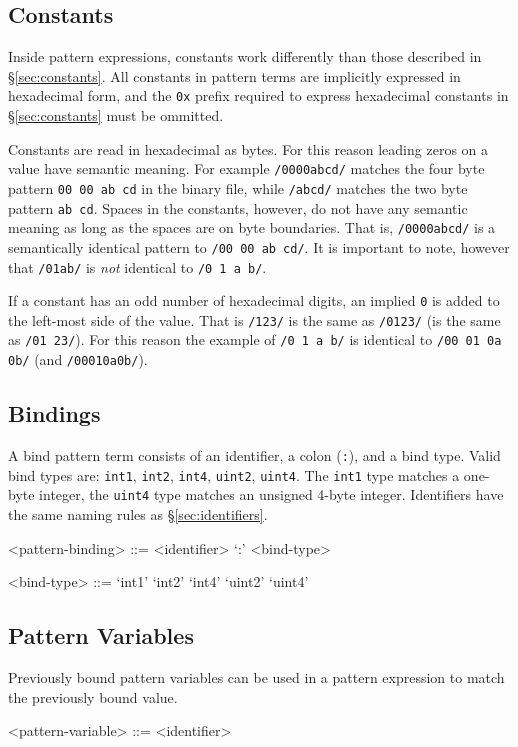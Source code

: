 \subsection{Constants}
\label{sec:pattern-constants}
Inside pattern expressions, constants work differently than those described in \S\ref{sec:constants}.  All constants in pattern terms are implicitly expressed in hexadecimal form, and the \texttt{0x} prefix required to express hexadecimal constants in \S\ref{sec:constants} must be ommitted.

Constants are read in hexadecimal as bytes.  For this reason leading zeros on a value have semantic meaning.  For example \texttt{/0000abcd/} matches the four byte pattern \texttt{00 00 ab cd} in the binary file, while \texttt{/abcd/} matches the two byte pattern \texttt{ab cd}.  Spaces in the constants, however, do not have any semantic meaning as long as the spaces are on byte boundaries.  That is, \texttt{/0000abcd/} is a semantically identical pattern to \texttt{/00 00 ab cd/}.  It is important to note, however that \texttt{/01ab/} is \emph{not} identical to \texttt{/0 1 a b/}.

If a constant has an odd number of hexadecimal digits, an implied \texttt{0} is added to the left-most side of the value.  That is \texttt{/123/} is the same as \texttt{/0123/} (is the same as \texttt{/01 23/}).  For this reason the example of \texttt{/0 1 a b/} is identical to \texttt{/00 01 0a 0b/} (and \texttt{/00010a0b/}).
 
\subsection{Bindings}
\label{sec:pattern-bindings}
A bind pattern term consists of an identifier, a colon (\texttt{:}), and a bind type.  Valid bind types are: \texttt{int1}, \texttt{int2}, \texttt{int4}, \texttt{uint2}, \texttt{uint4}.  The \texttt{int1} type matches a one-byte integer, the \texttt{uint4} type matches an unsigned 4-byte integer.  Identifiers have the same naming rules as \S\ref{sec:identifiers}.
\begin{grammar}
<pattern-binding> ::= <identifier> `:' <bind-type>

<bind-type> ::= `int1'
\alt `int2'
\alt `int4'
\alt `uint2'
\alt `uint4'
\end{grammar}

\subsection{Pattern Variables}
Previously bound pattern variables can be used in a pattern expression to match the previously bound value.
\begin{grammar}
<pattern-variable> ::= <identifier>
\end{grammar}

